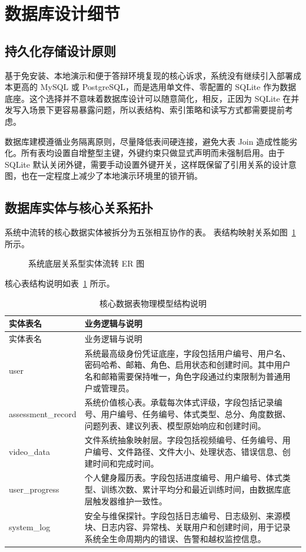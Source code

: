 \section{数据库设计细节}

\subsection{持久化存储设计原则}
基于免安装、本地演示和便于答辩环境复现的核心诉求，系统没有继续引入部署成本更高的 MySQL 或 PostgreSQL，而是选用单文件、零配置的 SQLite 作为数据底座。这个选择并不意味着数据库设计可以随意简化，相反，正因为 SQLite 在并发写入场景下更容易暴露问题，所以表结构、索引策略和读写方式都需要提前考虑。

数据库建模遵循业务隔离原则，尽量降低表间硬连接，避免大表 Join 造成性能劣化。所有表均设置自增整型主键，外键约束只做显式声明而未强制启用。由于 SQLite 默认关闭外键，需要手动设置外键开关，这样既保留了引用关系的设计意图，也在一定程度上减少了本地演示环境里的锁开销。

\subsection{数据库实体与核心关系拓扑}
系统中流转的核心数据实体被拆分为五张相互协作的表。
表结构映射关系如图~\ref{fig:db_er} 所示。

\begin{figure}[!htbp]
  \centering
  \YogaDatabaseERTikZ
  \caption{系统底层关系型实体流转 ER 图}
  \label{fig:db_er}
\end{figure}

核心表结构说明如表~\ref{tab:db_tables} 所示。

\begin{longtable}{>{\raggedright\arraybackslash}p{3.5cm}>{\raggedright\arraybackslash}p{9cm}}
\caption{核心数据表物理模型结构说明}\label{tab:db_tables}\\
\toprule
实体表名 & 业务逻辑与说明 \\
\midrule
\endfirsthead
\toprule
实体表名 & 业务逻辑与说明 \\
\midrule
\endhead
user & 系统最高级身份凭证底座，字段包括用户编号、用户名、密码哈希、邮箱、角色、启用状态和创建时间。其中用户名和邮箱需要保持唯一，角色字段通过约束限制为普通用户或管理员。 \\
assessment\_record & 系统价值核心表。承载每次体式评级，字段包括记录编号、用户编号、任务编号、体式类型、总分、角度数据、问题列表、建议列表、模型原始响应和创建时间。 \\
video\_data & 文件系统抽象映射层。字段包括视频编号、任务编号、用户编号、文件路径、文件大小、处理状态、错误信息、创建时间和完成时间。 \\
user\_progress & 个人健身履历表。字段包括进度编号、用户编号、体式类型、训练次数、累计平均分和最近训练时间，由数据库底层触发器维护一致性。 \\
system\_log & 安全与维保探针。字段包括日志编号、日志级别、来源模块、日志内容、异常栈、关联用户和创建时间，用于记录系统全生命周期内的错误、告警和越权监控信息。 \\
\bottomrule
\end{longtable}

